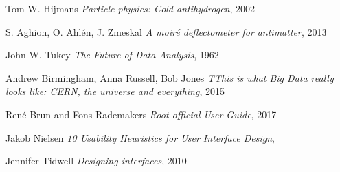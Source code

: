 \begin{thebibliography}{7}

 Tom W. Hijmans \emph{Particle physics: Cold antihydrogen}, 2002

 S. Aghion, O. Ahlén, J. Zmeskal \emph{A moiré deflectometer for antimatter}, 2013

 John W. Tukey \emph{The Future of Data Analysis}, 1962

  Andrew Birmingham, Anna Russell, Bob Jones \emph{TThis is what Big Data really looks like: CERN, the universe and everything}, 2015

  René Brun and Fons Rademakers \emph{Root official User Guide}, 2017

  Jakob Nielsen \emph{10 Usability Heuristics for User Interface Design},  

  Jennifer Tidwell \emph{Designing interfaces}, 2010

\end{thebibliography}
